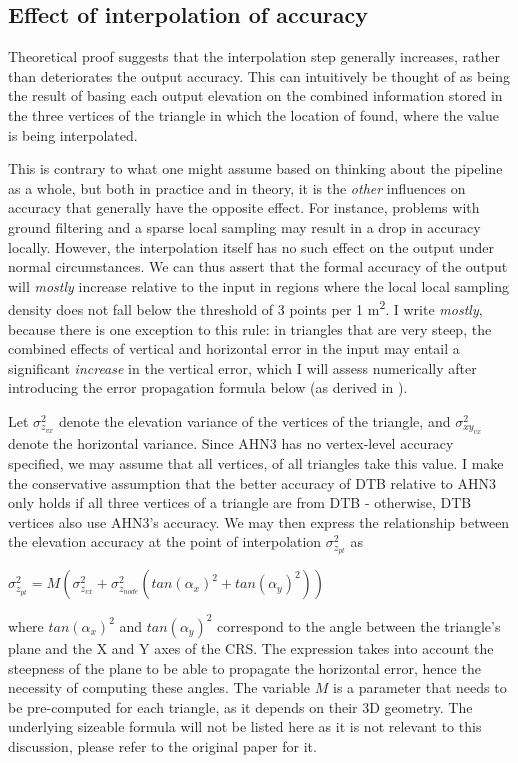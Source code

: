 \subsection{Effect of interpolation of accuracy}
\label{sub:m_accuracyinterpolation}

Theoretical proof suggests that the interpolation step generally increases, rather than deteriorates the output accuracy. This can intuitively be thought of as being the result of basing each output elevation on the combined information stored in the three vertices of the triangle in which the location of found, where the value is being interpolated.

This is contrary to what one might assume based on thinking about the pipeline as a whole, but both in practice and in theory, it is the \textit{other} influences on accuracy that generally have the opposite effect. For instance, problems with ground filtering and a sparse local sampling may result in a drop in accuracy locally. However, the interpolation itself has no such effect on the output under normal circumstances. We can thus assert that the formal accuracy of the output will \textit{mostly} increase relative to the input in regions where the local local sampling density does not fall below the threshold of 3 points per 1 m\textsuperscript{2}. I write \textit{mostly}, because there is one exception to this rule: in triangles that are very steep, the combined effects of vertical and horizontal error in the input may entail a significant \textit{increase} in the vertical error, which I will assess numerically after introducing the error propagation formula below (as derived in \cite{fan_etal_2014}).

Let $\sigma_{z_{vx}}^{2}$ denote the elevation variance of the vertices of the triangle, and $\sigma_{xy_{vx}}^{2}$ denote the horizontal variance. Since AHN3 has no vertex-level accuracy specified, we may assume that all vertices, of all triangles take this value. I make the conservative assumption that the better accuracy of DTB relative to AHN3 only holds if all three vertices of a triangle are from DTB - otherwise, DTB vertices also use AHN3's accuracy. We may then express the relationship between the elevation accuracy at the point of interpolation $\sigma_{z_{pt}}^{2}$ as

$\sigma_{z_{pt}}^{2} = M\left(\sigma_{z_{vx}}^{2} + \sigma_{z_{node}}^{2}\left(tan\left(\alpha_x\right)^2 + tan\left(\alpha_y\right)^2\right)\right)$

where $tan\left(\alpha_x\right)^2$ and $tan\left(\alpha_y\right)^2$ correspond to the angle between the triangle's plane and the X and Y axes of the CRS. The expression takes into account the steepness of the plane to be able to propagate the horizontal error, hence the necessity of computing these angles. The variable $M$ is a parameter that needs to be pre-computed for each triangle, as it depends on their 3D geometry. The underlying sizeable formula will not be listed here as it is not relevant to this discussion, please refer to the original paper for it.

